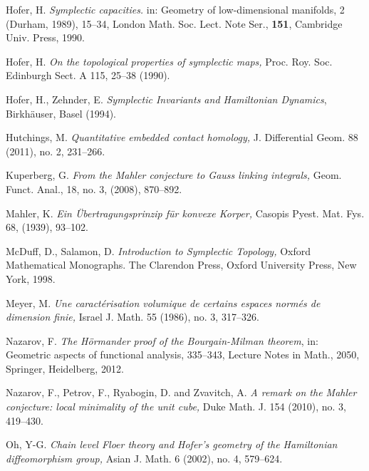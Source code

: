 \documentclass[11pt]{article}
\begin{document}
{\begin{thebibliography}{}
 Hofer, H. {\it Symplectic capacities.} in: Geometry of
low-dimensional manifolds, 2 (Durham, 1989), 15--34, London Math.
Soc. Lect. Note Ser., {\bf 151}, Cambridge Univ. Press, 1990.

 Hofer, H. {\it On the topological properties of symplectic
maps,} Proc. Roy. Soc. Edinburgh Sect. A 115, 25--38 (1990).

 Hofer, H., Zehnder, E. {\it Symplectic Invariants
and Hamiltonian Dynamics}, Birkh\"auser, Basel (1994).

 Hutchings, M. {\it Quantitative embedded contact homology,} J. Differential Geom. 88 (2011), no. 2, 231--266.


 Kuperberg, G. {\it From the Mahler conjecture to Gauss linking
integrals,} Geom. Funct. Anal., 18, no. 3, (2008),
870--892.




 Mahler, K. {\it Ein \"Ubertragungsprinzip f\"ur konvexe
Korper,} Casopis Pyest. Mat. Fys. 68, (1939), 93--102.

 McDuff, D., Salamon, D. {\it Introduction to Symplectic Topology,}
Oxford Mathematical Monographs. The Clarendon Press, Oxford
University Press, New York, 1998.

 Meyer, M. {\it Une caract\'erisation volumique de certains espaces
norm\'es de dimension finie,} Israel J. Math. 55 (1986), no. 3,
317--326.


 Nazarov, F. {\it The H\"{o}rmander proof of the Bourgain-Milman theorem}, in: Geometric aspects of functional analysis, 335--343, 
Lecture Notes in Math., 2050, Springer, Heidelberg, 2012. 

 Nazarov, F., Petrov, F., Ryabogin, D. and Zvavitch,
A. {\it A remark on the Mahler conjecture: local minimality of the unit cube,} Duke Math. J. 154 (2010), no. 3, 419--430. 

 Oh, Y-G. {\it Chain level Floer theory and Hofer's geometry of the Hamiltonian diffeomorphism
group,} Asian J. Math. 6 (2002), no. 4, 579--624.


\end{thebibliography}}
\end{document}
